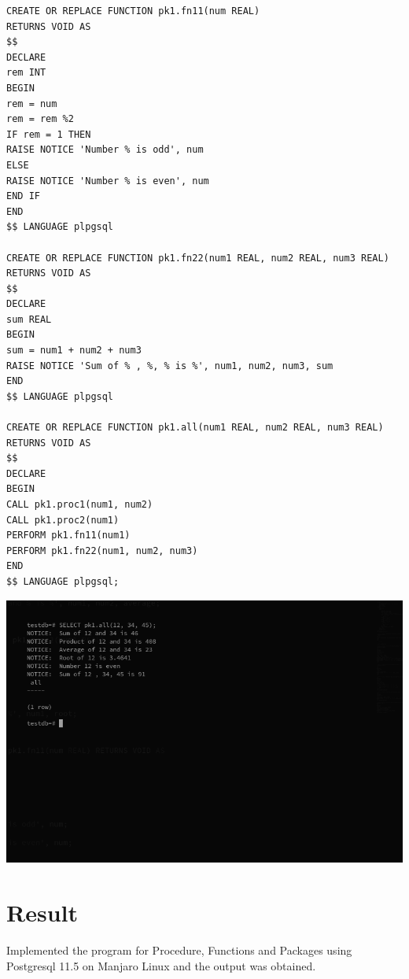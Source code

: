 \begin{enumerate}
\begin{verbatim}
CREATE OR REPLACE FUNCTION pk1.fn11(num REAL) 
RETURNS VOID AS
$$
DECLARE
rem INT
BEGIN
rem = num
rem = rem %2
IF rem = 1 THEN
RAISE NOTICE 'Number % is odd', num
ELSE
RAISE NOTICE 'Number % is even', num
END IF
END
$$ LANGUAGE plpgsql

CREATE OR REPLACE FUNCTION pk1.fn22(num1 REAL, num2 REAL, num3 REAL) 
RETURNS VOID AS
$$
DECLARE
sum REAL
BEGIN
sum = num1 + num2 + num3
RAISE NOTICE 'Sum of % , %, % is %', num1, num2, num3, sum
END
$$ LANGUAGE plpgsql

CREATE OR REPLACE FUNCTION pk1.all(num1 REAL, num2 REAL, num3 REAL)
RETURNS VOID AS
$$
DECLARE
BEGIN
CALL pk1.proc1(num1, num2)
CALL pk1.proc2(num1)
PERFORM pk1.fn11(num1)
PERFORM pk1.fn22(num1, num2, num3)
END
$$ LANGUAGE plpgsql;
\end{verbatim}

\newline
\includegraphics[width=\linewidth]{../Images/Functions/4.png}

\end{enumerate}

\section{Result}
Implemented the program for Procedure, Functions and Packages using Postgresql 11.5 on Manjaro Linux and the output was obtained.
\newpage
\null
